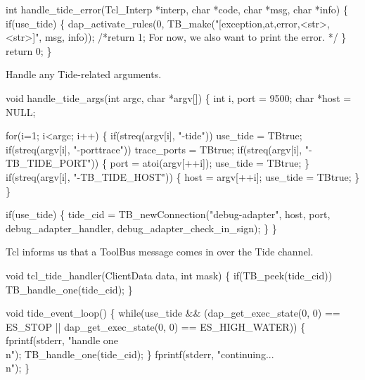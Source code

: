 \nwenddocs{}\endmoddef\let\nwnotused=\nwoutput{}
int handle_tide_error(Tcl_Interp *interp, char *code, char *msg, char *info)
\{
  if(use_tide) \{
    dap_activate_rules(0, TB_make("[exception,at,error,<str>,<str>]", msg, info));
    /*return 1; For now, we also want to print the error. */
  \}
  return 0;
\}
\nwendcode{}\nwdocspar


Handle any Tide-related arguments.

\nwenddocs{}\endmoddef\let\nwnotused=\nwoutput{}
void handle_tide_args(int argc, char *argv[])
\{
  int i, port = 9500;
  char *host = NULL; 

  for(i=1; i<argc; i++) \{
    if(streq(argv[i], "-tide"))
      use_tide = TBtrue;
    if(streq(argv[i], "-porttrace"))
      trace_ports = TBtrue;
    if(streq(argv[i], "-TB_TIDE_PORT")) \{
      port = atoi(argv[++i]);
      use_tide = TBtrue;
    \}
    if(streq(argv[i], "-TB_TIDE_HOST")) \{
      host = argv[++i];
      use_tide = TBtrue;
    \}
  \}

  if(use_tide) \{
    tide_cid = TB_newConnection("debug-adapter", host, port, 
                        debug_adapter_handler, debug_adapter_check_in_sign);
  \}
\}
\nwendcode{}\nwdocspar


Tcl informs us that a ToolBus message comes in over the Tide channel.

\nwenddocs{}\endmoddef\let\nwnotused=\nwoutput{}
void tcl_tide_handler(ClientData data, int mask)
\{
  if(TB_peek(tide_cid))
    TB_handle_one(tide_cid);
\}
\nwendcode{}\nwdocspar


\nwenddocs{}\endmoddef\let\nwnotused=\nwoutput{}
void tide_event_loop()
\{
  while(use_tide && (dap_get_exec_state(0, 0) == ES_STOP || 
        dap_get_exec_state(0, 0) == ES_HIGH_WATER)) \{
    fprintf(stderr, "handle one\\n");
    TB_handle_one(tide_cid);
  \}
  fprintf(stderr, "continuing...\\n");
\}
\nwendcode{}\nwdocspar

